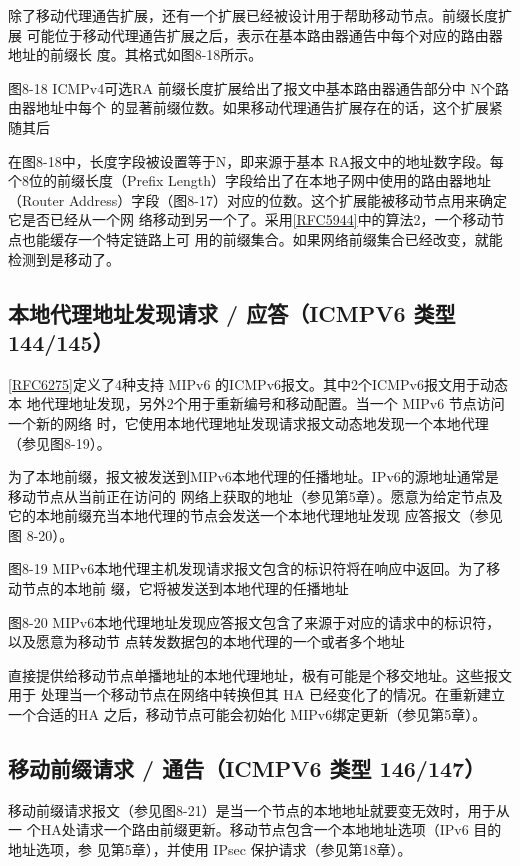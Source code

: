 除了移动代理通告扩展，还有一个扩展已经被设计用于帮助移动节点。前缀长度扩展
可能位于移动代理通告扩展之后，表示在基本路由器通告中每个对应的路由器地址的前缀长
度。其格式如图8-18所示。

图8-18 ICMPv4可选RA 前缀长度扩展给出了报文中基本路由器通告部分中 N个路由器地址中每个
的显著前缀位数。如果移动代理通告扩展存在的话，这个扩展紧随其后

在图8-18中，长度字段被设置等于N，即来源于基本 RA报文中的地址数字段。每
个8位的前缀长度（Prefix Length）字段给出了在本地子网中使用的路由器地址（Router
Address）字段（图8-17）对应的位数。这个扩展能被移动节点用来确定它是否已经从一个网
络移动到另一个了。采用\href{https://www.rfc-editor.org/rfc/rfc5944}{[RFC5944]}中的算法2，一个移动节点也能缓存一个特定链路上可
用的前缀集合。如果网络前缀集合已经改变，就能检测到是移动了。

\subsection{本地代理地址发现请求 / 应答（ICMPV6 类型 144/145）}
\href{https://www.rfc-editor.org/rfc/rfc6275}{[RFC6275]}定义了4种支持 MIPv6 的ICMPv6报文。其中2个ICMPv6报文用于动态本
地代理地址发现，另外2个用于重新编号和移动配置。当一个 MIPv6 节点访问一个新的网络
时，它使用本地代理地址发现请求报文动态地发现一个本地代理（参见图8-19）。

为了本地前缀，报文被发送到MIPv6本地代理的任播地址。IPv6的源地址通常是移动节点从当前正在访问的
网络上获取的地址（参见第5章）。愿意为给定节点及它的本地前缀充当本地代理的节点会发送一个本地代理地址发现
应答报文（参见图 8-20）。

图8-19 MIPv6本地代理主机发现请求报文包含的标识符将在响应中返回。为了移动节点的本地前
缀，它将被发送到本地代理的任播地址

图8-20 MIPv6本地代理地址发现应答报文包含了来源于对应的请求中的标识符，以及愿意为移动节
点转发数据包的本地代理的一个或者多个地址

直接提供给移动节点单播地址的本地代理地址，极有可能是个移交地址。这些报文用于
处理当一个移动节点在网络中转换但其 HA 已经变化了的情况。在重新建立一个合适的HA
之后，移动节点可能会初始化 MIPv6绑定更新（参见第5章）。

\subsection{移动前缀请求 / 通告（ICMPV6 类型 146/147）}
移动前缀请求报文（参见图8-21）是当一个节点的本地地址就要变无效时，用于从一
个HA处请求一个路由前缀更新。移动节点包含一个本地地址选项（IPv6 目的地址选项，参
见第5章），并使用 IPsec 保护请求（参见第18章）。

